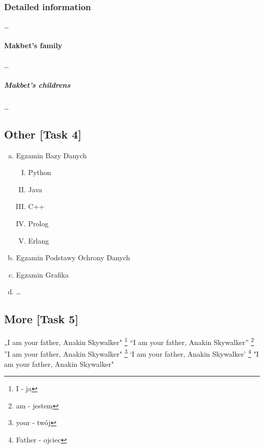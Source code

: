 \documentclass[12pt]{article}
\begin{document}
\subsubsection{Detailed information}
\ldots
\paragraph{Makbet's family}
\ldots
\subparagraph{Makbet's childrens}
\ldots

\newpage
\subsection{Other [Task 4]}
\begin{enumerate}[a)]
    \item Egzamin Bazy Danych
\begin{enumerate}[I.]
    \item Python
    \item Java
    \item C++
    \item Prolog
    \item Erlang
    
\end{enumerate}

    \item Egzamin Podstawy Ochrony Danych
    \item Egzamin Grafika
    \item \ldots

\end{enumerate}

\subsection{More [Task 5]}
„I am your father, Anakin Skywalker"
\footnote{I - ja}
\newline
``I am your father, Anakin Skywalker''
\footnote{am - jestem}
\newline
''I am your father, Anakin Skywalker"
\footnote{your - twój}
\newline
`I am your father, Anakin Skywalker'
\footnote{Father - ojciec}
\newline
"I am your father, Anakin Skywalker"
\end{document}
